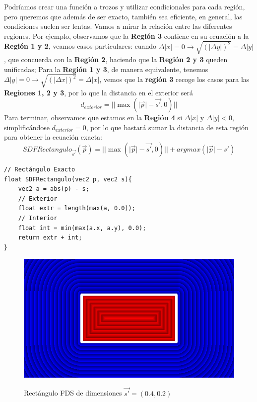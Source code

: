 Podríamos crear una función a trozos y utilizar condicionales para cada región, pero queremos que además de ser exacto, también sea eficiente, en general, las condiciones suelen ser lentas. Vamos a mirar la relación entre las diferentes regiones. Por ejemplo, observamos que la \textbf{Región 3} contiene en su ecuación a la \textbf{Región 1 y 2}, veamos casos particulares: cuando \(\Delta \vert x\vert =0\longrightarrow \sqrt{\left(\vert \Delta y\vert\right)^2} = \Delta \vert y\vert\), que concuerda con la \textbf{Región 2}, haciendo que la \textbf{Región 2 y 3} queden unificadas; Para la \textbf{Región 1 y 3}, de manera equivalente, tenemos \(\Delta \vert y\vert =0\longrightarrow \sqrt{\left(\vert \Delta x\vert\right)^2} = \Delta \vert x\vert\), vemos que la \textbf{región 3} recoge los casos para las \textbf{Regiones 1, 2 y 3}, por lo que la distancia en el exterior será
\[d_{exterior}=\vert\vert\max\left(\vert\Vec{p}\vert-\Vec{s'},0\right)\vert\vert\]
Para terminar, observamos que estamos en la \textbf{Región 4} si \(\Delta\vert x\vert \text{ y } \Delta\vert y\vert<0\), simplificándose \(d_{exterior} = 0\), por lo que bastará sumar la distancia de esta región para obtener la ecuación exacta:
\[SDFRectangulo_{\Vec{s'}}(\Vec{p})= \vert\vert\max\left(\vert\Vec{p}\vert-\Vec{s'},0\right)\vert\vert + argmax(\vert \Vec{p}\vert - {s'})\]
\begin{lstlisting}
// Rectángulo Exacto
float SDFRectangulo(vec2 p, vec2 s){
    vec2 a = abs(p) - s;
    // Exterior
    float extr = length(max(a, 0.0));
    // Interior
    float int = min(max(a.x, a.y), 0.0);
    return extr + int;
}
\end{lstlisting}
\begin{figure}[H]
  \centering
  \captionsetup{justification=centering}%
  \includegraphics[width=1.0\textwidth]{secciones/imagenes/sdf/2d/sdf_rectangulo.png}\label{fig:rectaangulo}
  \caption{Rectángulo FDS de dimensiones \(\Vec{s'}=(0.4, 0.2)\)}
\end{figure}

